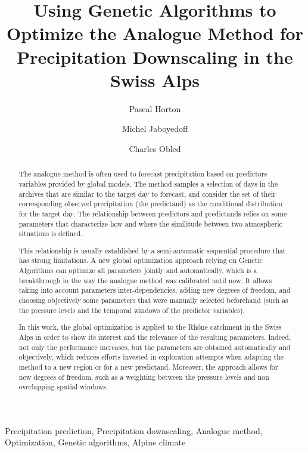 \documentclass[review]{elsarticle}
\begin{document}
\begin{frontmatter}

\title{Using Genetic Algorithms to Optimize the Analogue Method for Precipitation Downscaling in the Swiss Alps}

\author[unil,terranum]{Pascal Horton}

\author[unil]{Michel Jaboyedoff}
\author[lthe]{Charles Obled}

\address[unil]{University of Lausanne, Lausanne, Switzerland}
\address[terranum]{Terranum, Rue de l'industrie 35 bis, 1030 Bussigny, Switzerland}
\address[lthe]{Universit\'{e} de Grenoble-Alpes, LTHE, Grenoble, France}

\begin{abstract}
The analogue method is often used to forecast precipitation based on predictors variables provided by global models. The method samples a selection of days in the archives that are similar to the target day to forecast, and consider the set of their corresponding observed precipitation (the predictand) as the conditional distribution for the target day. The relationship between predictors and predictands relies on some parameters that characterize how and where the similitude between two atmospheric situations is defined.

This relationship is usually established by a semi-automatic sequential procedure that has strong limitations. A new global optimization approach relying on Genetic Algorithms can optimize all parameters jointly and automatically, which is a breakthrough in the way the analogue method was calibrated until now. It allows taking into account parameters inter-dependencies, adding new degrees of freedom, and choosing objectively some parameters that were manually selected beforehand (such as the pressure levels and the temporal windows of the predictor variables).

In this work, the global optimization is applied to the Rh\^{o}ne catchment in the Swiss Alps in order to show its interest and the relevance of the resulting parameters. Indeed, not only the performance increases, but the parameters are obtained automatically and objectively, which reduces efforts invested in exploration attempts when adapting the method to a new region or for a new predictand. Moreover, the approach allows for new degrees of freedom, such as a weighting between the pressure levels and non overlapping spatial windows.
\end{abstract}

\begin{keyword}
Precipitation prediction\sep
Precipitation downscaling\sep
Analogue method\sep
Optimization\sep
Genetic algorithms\sep
Alpine climate
\end{keyword}

\end{frontmatter}
\end{document}
